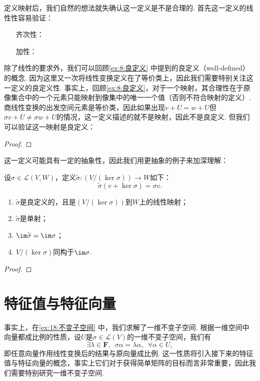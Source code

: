 定义映射后，我们自然的想法就失确认这一定义是不是合理的. 首先这一定义的线性性容易验证：
\begin{itemize}
    \item[齐次性：]

    \item[加性：]
\end{itemize}

除了线性的要求外，我们可以回顾\autoref{ex:8:良定义} 中提到的良定义（well-defined）的概念. 因为这里又一次将线性变换定义在了等价类上，因此我们需要特别关注这一定义的良定义性. 事实上，回顾\autoref{ex:8:良定义}，对于一个映射，其合理性在于原像集合中的一个元素只能映射到像集中的唯一一个值（否则不符合映射的定义）. 商线性变换的出发空间元素是等价类，因此如果出现$v+U=w+U$但$\sigma v+U\neq \sigma w+U$的情况，这一定义描述的就不是映射，因此不是良定义. 但我们可以验证这一映射是良定义：

\begin{proof}

\end{proof}

这一定义可能具有一定的抽象性，因此我们用更抽象的例子来加深理解：
\begin{example}
    设$\sigma\in \mathcal{L}(V,W)$，定义$\widetilde{\sigma}:(V/(\ker \sigma))\to W$如下：
    \[\widetilde{\sigma}(v+\ker\sigma)=\sigma v.\]
    \begin{enumerate}
        \item $\widetilde{\sigma}$是良定义的，且是$(V/(\ker \sigma))$到$W$上的线性映射；

        \item $\widetilde{\sigma}$是单射；

        \item $\im \widetilde{\sigma}=\im \sigma$；

        \item $V/(\ker \sigma)$同构于$\im \sigma$.
    \end{enumerate}
\end{example}

\begin{proof}

\end{proof}

\section{特征值与特征向量}

事实上，在\autoref{ex:18:不变子空间} 中，我们求解了一维不变子空间. 根据一维空间中向量都成比例的性质，设$U$是$\sigma\in\mathcal{L}(V)$的一维不变子空间，我们有
\[\exists\lambda\in\mathbf{F},\enspace\sigma\alpha=\lambda\alpha,\enspace\forall \alpha\in U,\]
即任意向量作用线性变换后的结果与原向量成比例. 这一性质将引入接下来的特征值与特征向量的概念，事实上它们对于获得简单矩阵的目标而言非常重要，因此我们需要特别研究一维不变子空间.


